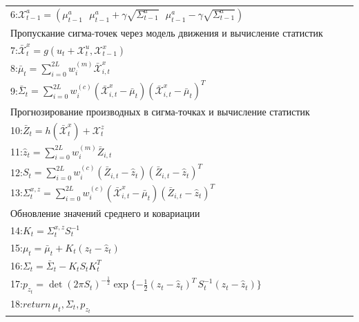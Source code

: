 \documentclass[10pt,a4paper]{article}
\begin{document}
\begin{table}[H]
\begin{center}
\begin{tabular}{|l|}
6:\hspace{5mm}$\mathcal{X}_{t-1}^a=(\mu_{t-1}^a\,\,\,\,\mu_{t-1}^a+\gamma\sqrt{\varSigma_{t-1}^a}\,\,\,\,\mu_{t-1}^a-\gamma\sqrt{\varSigma_{t-1}^a})$\\
\hspace{3mm}$\textit{Пропускание сигма-точек через модель движения и вычисление статистик гауссовых функций}$\\
7:\hspace{5mm}$\bar{\mathcal{X}}_t^x=g(u_t+\mathcal{X}_t^u,\mathcal{X}_{t-1}^x)$\\
8:\hspace{5mm}$\bar{\mu}_t=\sum_{i=0}^{2L}w_i^{(m)}\bar{\mathcal{X}}_{i,t}^x$\\
9:\hspace{5mm}$\bar{\varSigma}_t=\sum_{i=0}^{2L}w_i^{(c)}(\bar{\mathcal{X}}_{i,t}^x-\bar{\mu}_t)(\bar{\mathcal{X}}_{i,t}^x-\bar{\mu}_t)^T$\\
\hspace{3mm}$\textit{Прогнозирование производных в сигма-точках и вычисление статистик гауссовых функций}$\\
10:\hspace{4mm}$\bar{Z}_t=h(\bar{\mathcal{X}}_t^x)+\mathcal{X}_t^z$\\
11:\hspace{4mm}$\hat{z}_t=\sum_{i=0}^{2L}w_i^{(m)}\bar{Z}_{i,t}$\\
12:\hspace{4mm}$S_t=\sum_{i=0}^{2L}w_i^{(c)}(\bar{Z}_{i,t}-\hat{z}_t)(\bar{Z}_{i,t}-\hat{z}_t)^T$\\
13:\hspace{4mm}$\varSigma_t^{x,z}=\sum_{i=0}^{2L}w_i^{(c)}(\bar{\mathcal{X}}_{i,t}^x-\bar{\mu}_t)(\bar{Z}_{i,t}-\hat{z}_t)^T$\\
\hspace{3mm}$\textit{Обновление значений среднего и ковариации}$\\
14:\hspace{4mm}$K_t=\varSigma_t^{x,z}S_t^{-1}$\\
15:\hspace{4mm}$\mu_t=\bar{\mu}_t+K_t(z_t-\hat{z}_t)$\\
16:\hspace{4mm}$\varSigma_t=\bar{\varSigma}_t-K_t S_t K_t^T$\\
17:\hspace{4mm}$p_{z_t}=\det(2\pi S_t)^{-\frac{1}{2}}\exp\{-\frac{1}{2}(z_t-\hat{z}_t)^T\,S_t^{-1}(z_t-\hat{z}_t)\}$\\
18:\hspace{4mm}$\textit{return}\,\mu_t,\varSigma_t,p_{z_t}$\\

\end{tabular}
\end{center}
\end{table}
\end{document}

